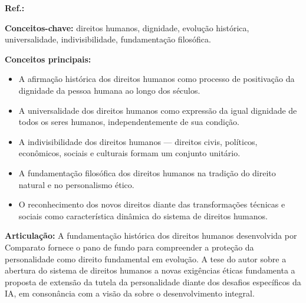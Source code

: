 \begin{fichamento}
    \textbf{Ref.:} \cite{Comparato2016DH}
    
    \textbf{Conceitos-chave:} direitos humanos, dignidade, evolução histórica, universalidade, indivisibilidade, fundamentação filosófica.
    
    \textbf{Conceitos principais:}
    \begin{itemize}
        \item A afirmação histórica dos direitos humanos como processo de positivação da dignidade da pessoa humana ao longo dos séculos.
        \item A universalidade dos direitos humanos como expressão da igual dignidade de todos os seres humanos, independentemente de sua condição.
        \item A indivisibilidade dos direitos humanos — direitos civis, políticos, econômicos, sociais e culturais formam um conjunto unitário.
        \item A fundamentação filosófica dos direitos humanos na tradição do direito natural e no personalismo ético.
        \item O reconhecimento dos novos direitos diante das transformações técnicas e sociais como característica dinâmica do sistema de direitos humanos.
    \end{itemize}
    
    \textbf{Articulação:} A fundamentação histórica dos direitos humanos desenvolvida por Comparato fornece o pano de fundo para compreender a proteção da personalidade como direito fundamental em evolução. A tese do autor sobre a abertura do sistema de direitos humanos a novas exigências éticas fundamenta a proposta de extensão da tutela da personalidade diante dos desafios específicos da IA, em consonância com a visão da \MH{} sobre o desenvolvimento integral.
\end{fichamento}

